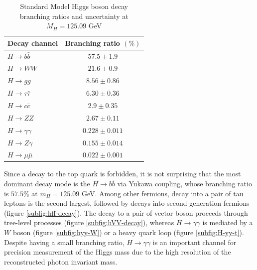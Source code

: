 \begin{table}[h]
    \centering
    \begin{tabular}{|l|c|}
    \hline \hline
     Decay channel    & Branching ratio $(\%)$ \\
     \hline
      $H\rightarrow b\bar{b}$   & $57.5\pm 1.9$ \\
      $H\rightarrow WW $   & $21.6\pm0.9$ \\
       $H\rightarrow gg$  & $8.56\pm0.86$ \\
        $H\rightarrow \tau\bar{\tau}$    & $6.30\pm 0.36$ \\
        $H\rightarrow c\bar{c}$    & $2.9\pm 0.35$ \\
        $H\rightarrow ZZ$    & $2.67\pm 0.11$ \\
        $H\rightarrow \gamma\gamma$    & $0.228\pm 0.011$ \\
        $H\rightarrow Z\gamma$    & $0.155\pm 0.014$ \\
        $H\rightarrow \mu\bar{\mu}$    & $0.022\pm 0.001$ \\
    \hline
    \end{tabular}
    \caption{Standard Model Higgs boson decay branching ratios and uncertainty at $M_H=125.09$ GeV}
    \label{tab:higgs-br}
\end{table}

Since a decay to the top quark is forbidden, it is not surprising that the most dominant decay mode is the $H\rightarrow b\bar{b}$ via Yukawa coupling, whose branching ratio is $57.5\%$ at $m_H=125.09$ GeV. 
Among other fermions, decay into a pair of tau leptons is the second largest, followed by decays into second-generation fermions (figure \ref{subfig:hff-decay}). 
The decay to a pair of vector boson proceeds through tree-level processes (figure \ref{subfig:hVV-decay}), whereas $H\rightarrow \gamma\gamma$ is mediated by a $W$ boson (figure \ref{subfig:hyy-W}) or a heavy quark loop (figure \ref{subfig:H-yy-t}). Despite having a small branching ratio, $H\rightarrow \gamma\gamma$ is an important channel for precision measurement of the Higgs mass due to the high resolution of the reconstructed photon invariant mass. 

